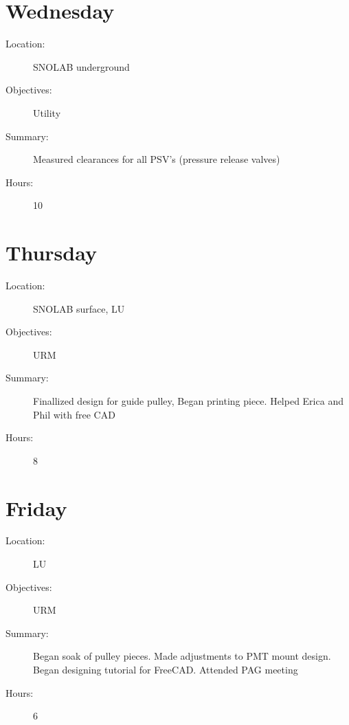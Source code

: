 \documentclass{article}
\begin{document}
\newpage
\section{Wednesday}

\begin{description}
\item[Location:]SNOLAB underground
\item[Objectives:] Utility
\item[Summary:]  Measured clearances for all PSV's (pressure release valves)
\item[Hours:] 10 

\end{description} 



\section{Thursday}

\begin{description}
\item[Location:] SNOLAB surface, LU
\item[Objectives:] URM
\item[Summary:] Finallized design for guide pulley, Began printing piece. Helped Erica and Phil with free CAD
\item[Hours:] 8

\end{description} 


\section{Friday}

\begin{description}
\item[Location:] LU
\item[Objectives:] URM
\item[Summary:] Began soak of pulley pieces. Made adjustments to PMT mount design. Began designing tutorial for FreeCAD. Attended PAG meeting
\item[Hours:] 6

\end{description} 





\end{document}
